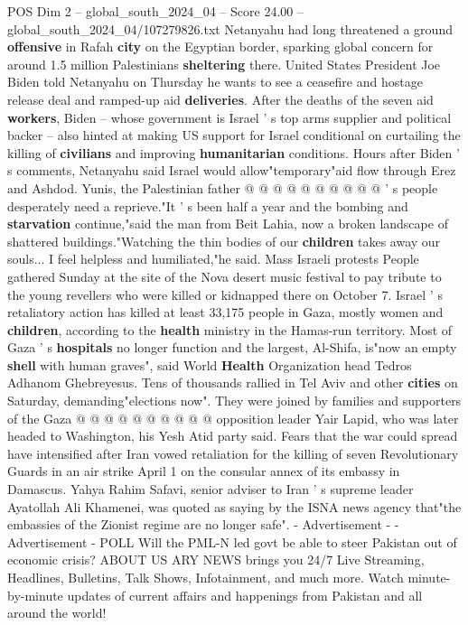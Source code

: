\begin{textsample}{POS Dim 2 – global\_south\_2024\_04 – Score 24.00 – global\_south\_2024\_04/107279826.txt}
Netanyahu had long threatened a ground \textbf{offensive} in Rafah \textbf{city} on the Egyptian border, sparking global concern for around 1.5 million Palestinians \textbf{sheltering} there.
United States President Joe Biden told Netanyahu on Thursday he wants to see a ceasefire and hostage release deal and ramped-up aid \textbf{deliveries}.
After the deaths of the seven aid \textbf{workers}, Biden -- whose government is Israel ' s top arms supplier and political backer -- also hinted at making US support for Israel conditional on curtailing the killing of \textbf{civilians} and improving \textbf{humanitarian} conditions.
Hours after Biden ' s comments, Netanyahu said Israel would allow"temporary"aid flow through Erez and Ashdod.
Yunis, the Palestinian father @ @ @ @ @ @ @ @ @ @ ' s people desperately need a reprieve."It ' s been half a year and the bombing and \textbf{starvation} continue,"said the man from Beit Lahia, now a broken landscape of shattered buildings."Watching the thin bodies of our \textbf{children} takes away our souls...
I feel helpless and humiliated,"he said.
Mass Israeli protests People gathered Sunday at the site of the Nova desert music festival to pay tribute to the young revellers who were killed or kidnapped there on October 7.
Israel ' s retaliatory action has killed at least 33,175 people in Gaza, mostly women and \textbf{children}, according to the \textbf{health} ministry in the Hamas-run territory.
Most of Gaza ' s \textbf{hospitals} no longer function and the largest, Al-Shifa, is"now an empty \textbf{shell} with human graves", said World \textbf{Health} Organization head Tedros Adhanom Ghebreyesus.
Tens of thousands rallied in Tel Aviv and other \textbf{cities} on Saturday, demanding"elections now".
They were joined by families and supporters of the Gaza @ @ @ @ @ @ @ @ @ @ opposition leader Yair Lapid, who was later headed to Washington, his Yesh Atid party said.
Fears that the war could spread have intensified after Iran vowed retaliation for the killing of seven Revolutionary Guards in an air strike April 1 on the consular annex of its embassy in Damascus.
Yahya Rahim Safavi, senior adviser to Iran ' s supreme leader Ayatollah Ali Khamenei, was quoted as saying by the ISNA news agency that"the embassies of the Zionist regime are no longer safe". - Advertisement - - Advertisement - POLL Will the PML-N led govt be able to steer Pakistan out of economic crisis?
ABOUT US ARY NEWS brings you 24/7 Live Streaming, Headlines, Bulletins, Talk Shows, Infotainment, and much more.
Watch minute-by-minute updates of current affairs and happenings from Pakistan and all around the world!

\end{textsample}
